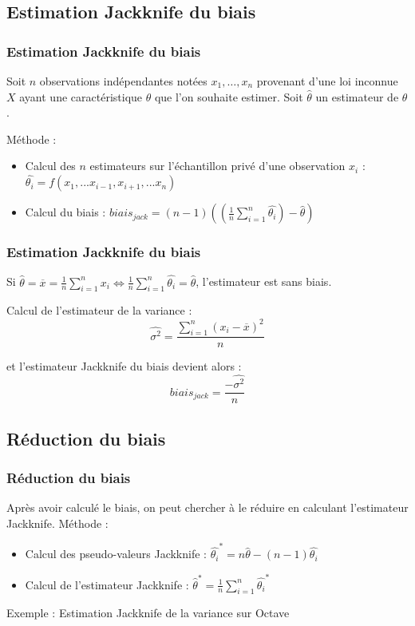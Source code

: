 \documentclass[handout]{beamer}
\begin{document}
		\subsection{Estimation Jackknife du biais}
		\begin{frame}
			\frametitle{Estimation Jackknife du biais}
			Soit $n$ observations indépendantes notées $x_1, \dots, x_n$ provenant d'une loi inconnue $X$ ayant une caractéristique $\theta$ que l'on souhaite estimer. Soit $\hat{\theta}$ un estimateur de $\theta$.

			\vspace{15px}
			Méthode :
			\begin{itemize}
				\item Calcul des $n$ estimateurs sur l'échantillon privé d'une observation $x_i$ : $\hat{\theta_i} = f(x_1,...x_{i-1},x_{i+1},...x_n)$
				\item Calcul du biais : $biais_{jack} = (n - 1)((\frac{1}{n} \sum\limits_{i=1}^n \hat{\theta_i}) - \hat{\theta})$
			\end{itemize}


		\end{frame}

		\begin{frame}
			\frametitle{Estimation Jackknife du biais}
			Si $\hat{\theta} = \overline{x} = \frac{1}{n} \sum\limits_{i=1}^n x_i \Leftrightarrow \frac{1}{n} \sum\limits_{i=1}^n \hat{\theta_i} = \hat{\theta}$, l'estimateur est sans biais.

			\vspace{15px}
			Calcul de l'estimateur de la variance :
			\[\hat{\sigma^2} = \frac{\sum\limits_{i=1}^n (x_i - \overline{x})^2}{n} \]

			et l'estimateur Jackknife du biais devient alors :
			\[biais_{jack} = \frac{-\hat{\sigma^2}}{n} \]
		\end{frame}

		\subsection{Réduction du biais}
		\begin{frame}
			\frametitle{Réduction du biais}
			Après avoir calculé le biais, on peut chercher à le réduire en calculant l'estimateur Jackknife.
			\vspace{15px}
			Méthode :
			\begin{itemize}
				\item Calcul des pseudo-valeurs Jackknife : $\hat{\theta_i}^* = n\hat{\theta} - (n-1) \hat{\theta_i}$
				\item Calcul de l'estimateur Jackknife : $\hat{\theta}^* = \frac{1}{n} \sum\limits_{i=1}^n \hat{\theta_i}^*$
			\end{itemize}
			\vspace{15px}
			Exemple : Estimation Jackknife de la variance sur Octave
		\end{frame}
\end{document}
